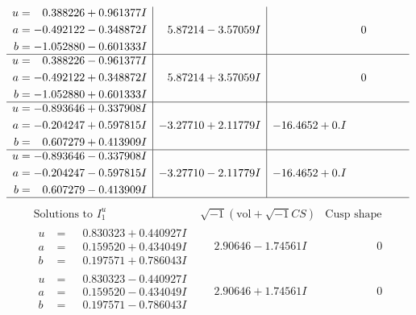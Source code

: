 \documentclass[1p]{elsarticle_modified}
\theoremstyle{definition}
\newcommand{\I}{\sqrt{-1}}
\begin{document}
$$\begin{array}{c|c|c}
\begin{aligned}
u &= \phantom{-}0.388226 + 0.961377 I \\
a &= -0.492122 - 0.348872 I \\
b &= -1.052880 - 0.601333 I\end{aligned}
 & \phantom{-}5.87214 - 3.57059 I & \phantom{-0.000000 } 0 \\ \hline\begin{aligned}
u &= \phantom{-}0.388226 - 0.961377 I \\
a &= -0.492122 + 0.348872 I \\
b &= -1.052880 + 0.601333 I\end{aligned}
 & \phantom{-}5.87214 + 3.57059 I & \phantom{-0.000000 } 0 \\ \hline\begin{aligned}
u &= -0.893646 + 0.337908 I \\
a &= -0.204247 + 0.597815 I \\
b &= \phantom{-}0.607279 + 0.413909 I\end{aligned}
 & -3.27710 + 2.11779 I & -16.4652 + 0. I\phantom{ +0.000000I} \\ \hline\begin{aligned}
u &= -0.893646 - 0.337908 I \\
a &= -0.204247 - 0.597815 I \\
b &= \phantom{-}0.607279 - 0.413909 I\end{aligned}
 & -3.27710 - 2.11779 I & -16.4652 + 0. I\phantom{ +0.000000I}\\
 \hline 
 \end{array}$$\newpage$$\begin{array}{c|c|c}  
\text{Solutions to }I^u_{1}& \I (\text{vol} + \sqrt{-1}CS) & \text{Cusp shape}\\
 \hline 
\begin{aligned}
u &= \phantom{-}0.830323 + 0.440927 I \\
a &= \phantom{-}0.159520 + 0.434049 I \\
b &= \phantom{-}0.197571 + 0.786043 I\end{aligned}
 & \phantom{-}2.90646 - 1.74561 I & \phantom{-0.000000 } 0 \\ \hline\begin{aligned}
u &= \phantom{-}0.830323 - 0.440927 I \\
a &= \phantom{-}0.159520 - 0.434049 I \\
b &= \phantom{-}0.197571 - 0.786043 I\end{aligned}
 & \phantom{-}2.90646 + 1.74561 I & \phantom{-0.000000 } 0 \\ \hline\begin{aligned}

\end{aligned}
\end{array}$$
\end{document}
